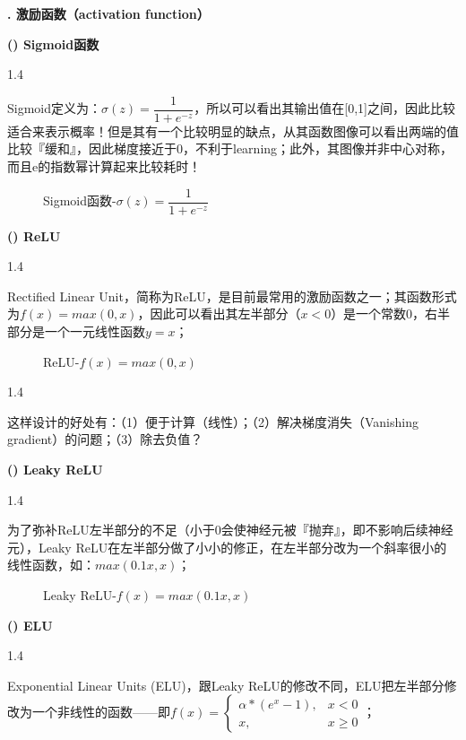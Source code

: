 \documentclass{article}
\newcounter{x2}%
\newcounter{x3}[x2]
\newcounter{x4}[x3]
\newcounter{x5}[x4]
\newcommand{\updateCounter}[2]{\stepcounter{#1}\setcounter{#2}{1}}
\newcommand{\TP}[1]{\begin{spacing}{1.4}\par{#1}\end{spacing}}
\newcommand{\TL}[1]{\begin{flushleft}#1\end{flushleft}}
\newcommand{\xxxx}[1]{\TL{\fontsize{16pt}{0}\textbf{\yh\arabic{x4}. #1}\\[1.5em]}\updateCounter{x4}{x5}}
\newcommand{\xxxxx}[1]{\TL{\fontsize{12pt}{0}\textbf{\yh(\arabic{x5})  #1}\\[1.5em]}\stepcounter{x5}}
\begin{document}
	\xxxx{激励函数（activation function）}
	\xxxxx{Sigmoid函数}
	\TP{Sigmoid定义为：$\sigma(z)=\dfrac{1}{1+e^{-z}}$，所以可以看出其输出值在[0,1]之间，因此比较适合来表示概率！但是其有一个比较明显的缺点，从其函数图像可以看出两端的值比较『缓和』，因此梯度接近于0，不利于learning；此外，其图像并非中心对称，而且e的指数幂计算起来比较耗时！}
	\begin{figure}[ht]
		\centering
	\caption{Sigmoid函数-$\sigma(z)=\dfrac{1}{1+e^{-z}}$}
	\end{figure}
	\xxxxx{ReLU}
	\TP{Rectified Linear Unit，简称为ReLU，是目前最常用的激励函数之一；其函数形式为$f(x)=max(0,x)$，因此可以看出其左半部分（$x<0$）是一个常数0，右半部分是一个一元线性函数$y=x$；}
	\begin{figure}[ht]
		\centering
		\caption{ReLU-$f(x)=max(0,x)$}
	\end{figure}
	\TP{这样设计的好处有：（1）便于计算（线性）；（2）解决梯度消失（Vanishing gradient）的问题；（3）除去负值？}
	\xxxxx{Leaky ReLU}
	\TP{为了弥补ReLU左半部分的不足（小于0会使神经元被『抛弃』，即不影响后续神经元），Leaky ReLU在左半部分做了小小的修正，在左半部分改为一个斜率很小的线性函数，如：$max(0.1x,x)$；}
	\begin{figure}[ht]
		\centering
		\caption{Leaky ReLU-$f(x)=max(0.1x,x)$}
	\end{figure}
	\xxxxx{ELU}
	\TP{Exponential Linear Units (ELU)，跟Leaky ReLU的修改不同，ELU把左半部分修改为一个非线性的函数——即$f(x)=\begin{cases}\alpha*(e^x-1), &x<0 \\ x, &x\ge 0\end{cases}$；}
\end{document}
